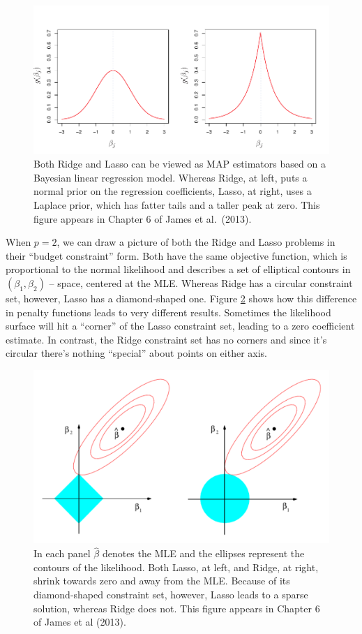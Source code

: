 \begin{figure}
	\centering
	\includegraphics[scale=0.85]{./img/ISLR_ch6_fig11}
	\caption{Both Ridge and Lasso can be viewed as MAP estimators based on a Bayesian linear regression model. Whereas Ridge, at left, puts a normal prior on the regression coefficients, Lasso, at right, uses a Laplace prior, which has fatter tails and a taller peak at zero. This figure appears in Chapter 6 of James et al.\ (2013).}
	\label{fig:ridge_lasso_prior}
\end{figure}

When $p=2$, we can draw a picture of both the Ridge and Lasso problems in their ``budget constraint'' form. Both have the same objective function, which is proportional to the normal likelihood and describes a set of elliptical contours in $(\beta_1,\beta_2)$ -- space, centered at the MLE. Whereas Ridge has a circular constraint set, however, Lasso has a diamond-shaped one. Figure \ref{fig:ridge_lasso_constraint} shows how this difference in penalty functions leads to very different results. Sometimes the likelihood surface will hit a ``corner'' of the Lasso constraint set, leading to a zero coefficient estimate. In contrast, the Ridge constraint set has no corners and since it's circular there's nothing ``special'' about points on either axis.

\begin{figure}
	\centering
	\includegraphics[scale=0.6]{./img/ISLR_ch6_fig7}
	\caption{In each panel $\widehat{\beta}$ denotes the MLE and the ellipses represent the contours of the likelihood. Both Lasso, at left, and Ridge, at right, shrink towards zero and away from the MLE. Because of its diamond-shaped constraint set, however, Lasso leads to a sparse solution, whereas Ridge does not. This figure appears in Chapter 6 of James et al (2013).}
	\label{fig:ridge_lasso_constraint}
\end{figure}

